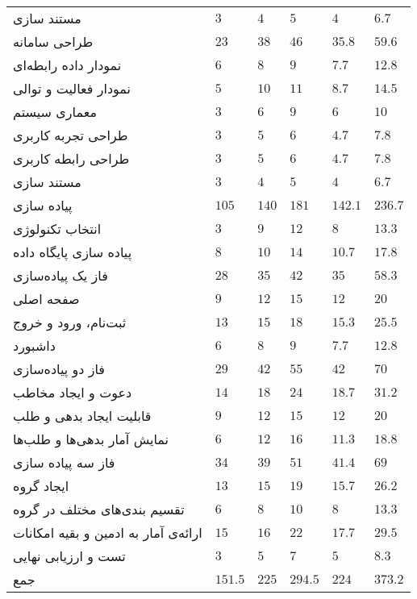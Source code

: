 \begin{table}[H]
{\begin{tabular}{|C{0.16666\textwidth}C{0.16666\textwidth}C{0.16666\textwidth}C{0.16666\textwidth}C{0.16666\textwidth}C{0.16666\textwidth}|}
مستند سازی  & $3$ & $4$ & $5$ & $4$ & $6.7$ \\
طراحی سامانه & $23$ & $38$ & $46$ & $35.8$ & $59.6$ \\
نمودار‌ داده رابطه‌ای & $6$ & $8$ & $9$ & $7.7$ & $12.8$ \\
نمودار فعالیت و توالی & $5$ & $10$ & $11$ & $8.7$ & $14.5$ \\
معماری سیستم & $3$ & $6$ & $9$ & $6$ & $10$ \\
طراحی تجربه کاربری & $3$ & $5$ & $6$ & $4.7$ & $7.8$ \\
طراحی رابطه کاربری & $3$ & $5$ & $6$ & $4.7$ & $7.8$ \\
مستند سازی  & $3$ & $4$ & $5$ & $4$ & $6.7$ \\
پیاده سازی & $105$ & $140$ & $181$ & $142.1$ & $236.7$ \\
انتخاب تکنولوژی & $3$ & $9$ & $12$ & $8$ & $13.3$ \\
پیاده سازی پایگاه داده & $8$ & $10$ & $14$ & $10.7$ & $17.8$ \\
فاز یک پیاده‌سازی & $28$ & $35$ & $42$ & $35$ & $58.3$ \\
صفحه اصلی & $9$ & $12$ & $15$ & $12$ & $20$ \\
ثبت‌نام، ورود و خروج & $13$ & $15$ & $18$ & $15.3$ & $25.5$ \\
داشبورد & $6$ & $8$ & $9$ & $7.7$ & $12.8$ \\
فاز دو پیاده‌سازی & $29$ & $42$ & $55$ & $42$ & $70$ \\
دعوت و ایجاد مخاطب & $14$ & $18$ & $24$ & $18.7$ & $31.2$ \\
قابلیت ایجاد بدهی و طلب & $9$ & $12$ & $15$ & $12$ & $20$ \\
نمایش آمار بدهی‌ها و طلب‌ها & $6$ & $12$ & $16$ & $11.3$ & $18.8$ \\
فاز سه پیاده سازی & $34$ & $39$ & $51$ & $41.4$ & $69$ \\
ایجاد گروه & $13$ & $15$ & $19$ & $15.7$ & $26.2$ \\
تقسیم بندی‌های مختلف در گروه & $6$ & $8$ & $10$ & $8$ & $13.3$ \\
ارائه‌ی آمار به ادمین و بقیه امکانات & $15$ & $16$ & $22$ & $17.7$ & $29.5$ \\
تست و ارزیابی نهایی & $3$ & $5$ & $7$ & $5$ & $8.3$ \\
جمع & $151.5$ & $225$ & $294.5$ & $224$ & $373.2$ \\


			\hline
		\end{tabular}
	}
\end{table}


